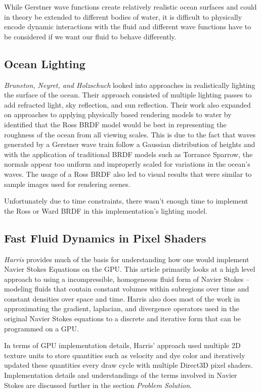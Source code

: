 \documentclass[conference]{IEEEtran}
\begin{document}
While Gerstner wave functions create relatively realistic ocean surfaces and could in theory be extended to different bodies of water, it is difficult to physically encode dynamic interactions with the fluid and different wave functions have to be considered if we want our fluid to behave differently.

\subsection{Ocean Lighting}

\textit{Bruneton, Neyret, and Holzschuch} looked into approaches in realistically lighting the surface of the ocean\cite{otherpbr}. Their approach consisted of multiple lighting passes to add refracted light, sky reflection, and sun reflection. Their work also expanded on approaches to applying physically based rendering models to water by identified that the Ross BRDF model would be best in representing the roughness of the ocean from all viewing scales. This is due to the fact that waves generated by a Gerstner wave train follow a Gaussian distribution of heights and with the application of traditional BRDF models such as Torrance Sparrow, the normals appear too uniform and improperly scaled for variations in the ocean's waves. The usage of a Ross BRDF also led to visual results that were similar to sample images used for rendering scenes.

Unfortunately due to time constraints, there wasn't enough time to implement the Ross or Ward BRDF in this implementation's lighting model.

\subsection{Fast Fluid Dynamics in Pixel Shaders}

\textit{Harris} provides much of the basis for understanding how one would implement Navier Stokes Equations on the GPU\cite{navierstokes}. This article primarily looks at a high level approach to using a incompressible, homogeneous fluid form of Navier Stokes -- modeling fluids that contain constant volumes within subregions over time and constant densities over space and time. Harris also does most of the work in approximating the gradient, laplacian, and divergence operators used in the original Navier Stokes equations to a discrete and iterative form that can be programmed on a GPU.

In terms of GPU implementation details, Harris' approach used multiple 2D texture units to store quantities such as velocity and dye color and iteratively updated these quantities every draw cycle with multiple Direct3D pixel shaders. Implementation details and understandings of the terms involved in Navier Stokes are discussed further in the section \textit{Problem Solution}.
\end{document}

